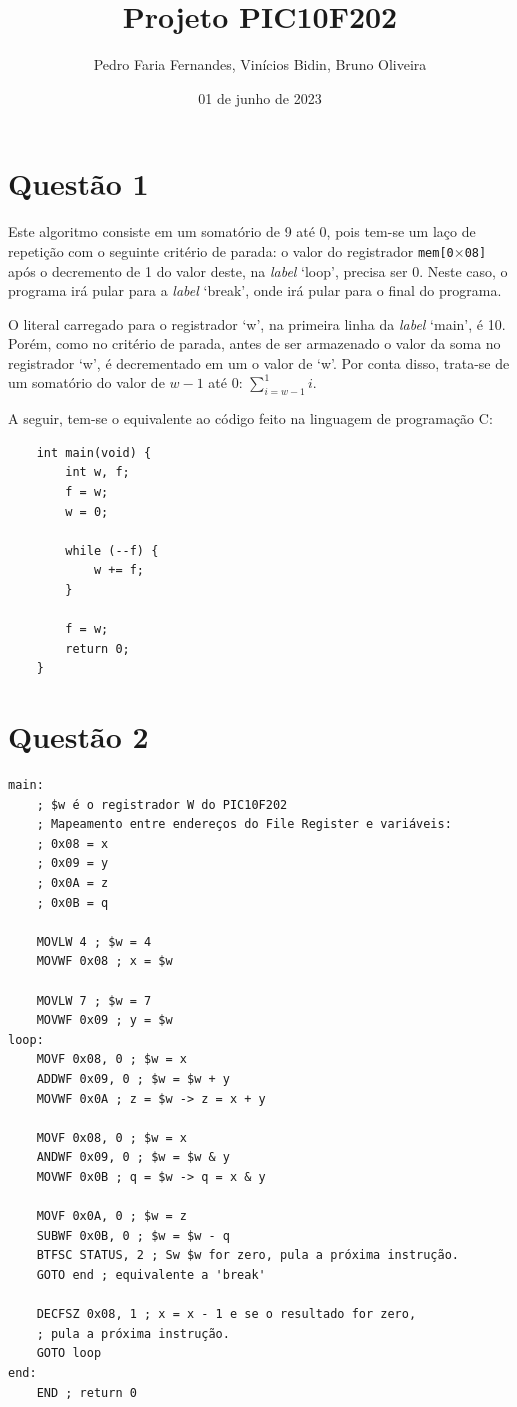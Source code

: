 \documentclass[12pt]{report}
\title{Projeto PIC10F202}
\author{Pedro Faria Fernandes, Vinícios Bidin, Bruno Oliveira}
\date{01 de junho de 2023}
\begin{document}
	\maketitle
	\section*{Questão 1}
		Este algoritmo consiste em um somatório de 9 até 0, pois tem-se um laço de repetição com o seguinte critério de parada: o valor do registrador \texttt{mem[0$\times$08]}
		após o decremento de 1 do valor deste, na \textit{label} `loop', precisa ser 0. Neste caso, o programa irá pular para a \textit{label} `break', onde irá pular para o final do programa.

		O literal carregado para o registrador `w', na primeira linha da \textit{label} `main', é 10. Porém, como no critério de parada, antes de ser armazenado o valor da soma no registrador `w', é decrementado em um o valor de `w'. Por conta disso, trata-se de um somatório do valor de $w - 1$ até 0: $\sum\limits_{i=w-1}^{1}i$.

		A seguir, tem-se o equivalente ao código feito na linguagem de programação C:\@
	\begin{verbatim}
	int main(void) {
		int w, f;
		f = w;
		w = 0;

		while (--f) {
			w += f;
		}

		f = w;
		return 0;
	}
	\end{verbatim}
	\clearpage
	\section*{Questão 2}
		\begin{verbatim}
main:
    ; $w é o registrador W do PIC10F202
    ; Mapeamento entre endereços do File Register e variáveis: 
    ; 0x08 = x
    ; 0x09 = y
    ; 0x0A = z
    ; 0x0B = q

    MOVLW 4 ; $w = 4
    MOVWF 0x08 ; x = $w

    MOVLW 7 ; $w = 7
    MOVWF 0x09 ; y = $w
loop:
    MOVF 0x08, 0 ; $w = x
    ADDWF 0x09, 0 ; $w = $w + y
    MOVWF 0x0A ; z = $w -> z = x + y
		
    MOVF 0x08, 0 ; $w = x
    ANDWF 0x09, 0 ; $w = $w & y
    MOVWF 0x0B ; q = $w -> q = x & y
		
    MOVF 0x0A, 0 ; $w = z
    SUBWF 0x0B, 0 ; $w = $w - q
    BTFSC STATUS, 2 ; Sw $w for zero, pula a próxima instrução. 
    GOTO end ; equivalente a 'break'
		
    DECFSZ 0x08, 1 ; x = x - 1 e se o resultado for zero,
    ; pula a próxima instrução.
    GOTO loop
end:
    END ; return 0
		\end{verbatim}
\end{document}
